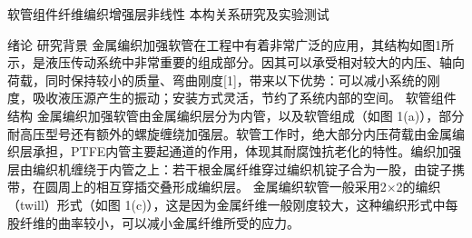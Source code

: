 \documentclass[12pt,a4paper]{book}
\begin{document}
	
	
	
	
	
	
	
	
	
	
	
	
	软管组件纤维编织增强层非线性
本构关系研究及实验测试
 




 


绪论
研究背景
金属编织加强软管在工程中有着非常广泛的应用，其结构如图1所示，是液压传动系统中非常重要的组成部分。因其可以承受相对较大的内压、轴向荷载，同时保持较小的质量、弯曲刚度[1]，带来以下优势：可以减小系统的刚度，吸收液压源产生的振动；安装方式灵活，节约了系统内部的空间。
软管组件结构
金属编织加强软管由金属编织层分为内管，以及软管组成（如图 1(a)），部分耐高压型号还有额外的螺旋缠绕加强层。软管工作时，绝大部分内压荷载由金属编织层承担，PTFE内管主要起通道的作用，体现其耐腐蚀抗老化的特性。编织加强层由编织机缠绕于内管之上：若干根金属纤维穿过编织机锭子合为一股，由锭子携带，在圆周上的相互穿插交叠形成编织层。
金属编织软管一般采用2×2的编织（twill）形式（如图 1(c)），这是因为金属纤维一般刚度较大，这种编织形式中每股纤维的曲率较小，可以减小金属纤维所受的应力。

 	 	 
					
\end{document}

